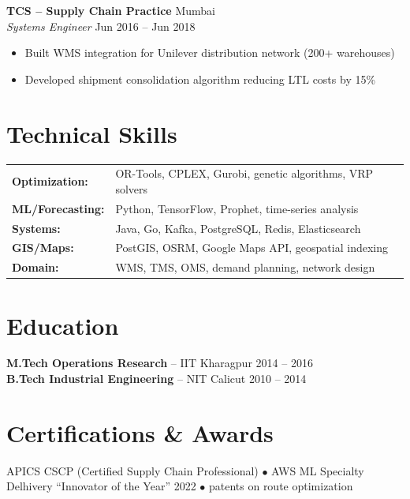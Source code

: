 \documentclass[10pt,letterpaper]{article}
\begin{document}
\textbf{TCS -- Supply Chain Practice} \hfill Mumbai\\
\textit{Systems Engineer} \hfill Jun 2016 -- Jun 2018
\begin{itemize}
\item Built WMS integration for Unilever distribution network (200+ warehouses)
\item Developed shipment consolidation algorithm reducing LTL costs by 15\%
\end{itemize}

\section{Technical Skills}
\begin{tabularx}{\linewidth}{@{}lX@{}}
\textbf{Optimization:} & OR-Tools, CPLEX, Gurobi, genetic algorithms, VRP solvers\\
\textbf{ML/Forecasting:} & Python, TensorFlow, Prophet, time-series analysis\\
\textbf{Systems:} & Java, Go, Kafka, PostgreSQL, Redis, Elasticsearch\\
\textbf{GIS/Maps:} & PostGIS, OSRM, Google Maps API, geospatial indexing\\
\textbf{Domain:} & WMS, TMS, OMS, demand planning, network design\\
\end{tabularx}

\section{Education}
\textbf{M.Tech Operations Research} -- IIT Kharagpur \hfill 2014 -- 2016\\
\textbf{B.Tech Industrial Engineering} -- NIT Calicut \hfill 2010 -- 2014

\section{Certifications \& Awards}
APICS CSCP (Certified Supply Chain Professional) \quad $\bullet$ \quad AWS ML Specialty\\
Delhivery ``Innovator of the Year'' 2022 \quad $\bullet$  patents on route optimization
\end{document}
